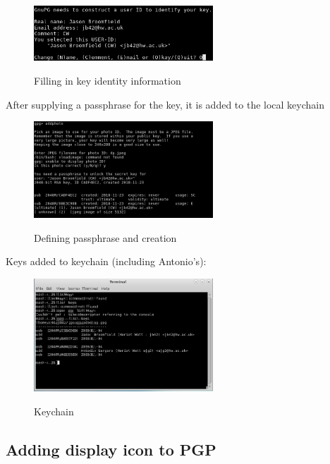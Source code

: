 \begin{figure}[hbt!]
	\centering
      \includegraphics[width=0.6\textwidth]{imgs/pgp/4} \\
	\caption{Filling in key identity information}
	\label{fig:specifiyingkeysize}
    \noindent\makebox[\linewidth]{}
\end{figure}

\noindent After supplying a passphrase for the key, it is added to the local keychain

\begin{figure}[hbt!]
	\centering
      \includegraphics[width=0.6\textwidth]{imgs/pgp/6} \\
	\caption{Defining passphrase and creation}
	\label{fig:specifiyingkeysize}
    \noindent\makebox[\linewidth]{}
\end{figure}

\noindent Keys added to keychain (including Antonio's):

\begin{figure}[hbt!]
	\centering
      \includegraphics[width=0.6\textwidth]{imgs/pgp/final} \\
	\caption{Keychain}
	\label{fig:specifiyingkeysize}
    \noindent\makebox[\linewidth]{}
\end{figure}

\subsection{Adding display icon to PGP}

